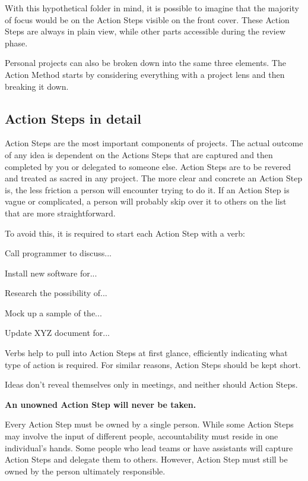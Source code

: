 With this hypothetical folder in mind, it is possible to imagine that the majority of focus would be on the Action Steps visible on the front cover. These Action Steps are always in plain view, while other parts accessible during the review phase.

Personal projects can also be broken down into the same three elements. The Action Method starts by considering everything with a project lens and then breaking it down.

\subsection{Action Steps in detail}

Action Steps are the most important components of projects. The actual outcome of any idea is dependent on the Actions Steps that are captured and then completed by you or delegated to someone else. Action Steps are to be revered and treated as sacred in any project. The more clear and concrete an Action Step is, the less friction a person will encounter trying to do it. If an Action Step is vague or complicated, a person will probably skip over it to others on the list that are more straightforward.

To avoid this, it is required to start each Action Step with a verb:
\begin{compactitem}
   \item Call programmer to discuss...
   \item Install new software for...
   \item Research the possibility of...
   \item Mock up a sample of the...
   \item Update XYZ document for...
\end{compactitem}

Verbs help to pull into Action Steps at first glance, efficiently indicating what type of action is required. For similar reasons, Action Steps should be kept short.

Ideas don’t reveal themselves only in meetings, and neither should Action Steps.

\textbf{An unowned Action Step will never be taken.}

Every Action Step must be owned by a single person. While some Action Steps may involve the input of different people, accountability must reside in one individual’s hands. Some people who lead teams or have assistants will capture Action Steps and delegate them to others. However, Action Step must still be owned by the person ultimately responsible.

